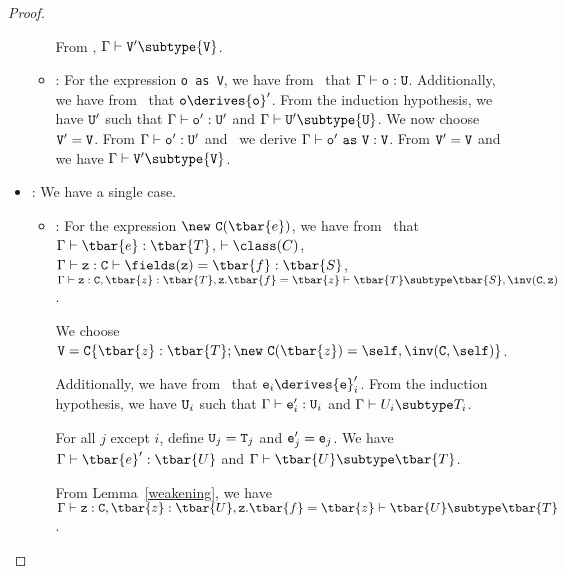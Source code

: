 \begin{proof}
\begin{itemize}
\begin{itemize}
            From , $\Gamma \vdash {\tt V}' \subtype {\tt V}$.
   \item
   \RCCast: For the expression {\tt o~as~V}, we have from \TCast\ that
            $\Gamma \vdash {\tt o}: {\tt U}$.
            Additionally, we have from \RCCast\ that
            ${\tt o} \derives {{\tt o}}'$.
            From the induction hypothesis, we have ${\tt U}'$ such that
            $\Gamma \vdash {\tt o}': {\tt U}'$ and
            $\Gamma \vdash {\tt U}' \subtype {\tt U}$.
            We now choose ${\tt V}'={\tt V}$.
            From $\Gamma \vdash {\tt o}': {\tt U}'$ and \TCast\ we derive
            $\Gamma \vdash {\tt o}'{\tt ~as~V} : {\tt V}$.
            From ${\tt V}'={\tt V}$ and 
            we have $\Gamma \vdash {\tt V}' \subtype {\tt V}$.
   \end{itemize}
\item
\TNew: We have a single case.
   \begin{itemize}
   \item
   \RCNewArg: For the expression ${\new\ {\tt C}(\tbar{e})}$,
            we have from \TNew\ that
            $\Gamma \vdash \tbar{e}: \tbar{T}$,
            $\vdash \class(C)$,
            $\Gamma \vdash {\tt z}: {\tt C} \vdash \fields({\tt z}) = \tbar{f}: \tbar{S}$,
            $\Gamma \vdash {\tt z}: {\tt C}, \tbar{z}: \tbar{T}, {\tt z}.\tbar{f} = \tbar{z} \vdash \tbar{T} \subtype \tbar{S}, \inv({\tt C}, {\tt z})$.

            We choose
            ${\tt V} = {\tt C}\{ \tbar{z}: \tbar{T}; \new\ {\tt C}(\tbar{z}) = \self, \inv({\tt C}, \self)\}$.

            Additionally, we have from \RCNewArg\ that
            ${\tt e}_i \derives {{\tt e}}_i'$.
            From the induction hypothesis, we have ${\tt U}_i$ such that
            $\Gamma \vdash {\tt e}_i': {{\tt U}}_i$ and 
            $\Gamma \vdash U_i \subtype T_i$.

            For all $j$ except $i$, define ${\tt U}_j = {\tt T}_j$ and ${\tt e}_j' = {\tt e}_j$.
            We have 
            $\Gamma \vdash \tbar{e}': \tbar{U}$ and
            $\Gamma \vdash \tbar{U} \subtype \tbar{T}$.

            From Lemma~\ref{weakening}, we have
            $\Gamma \vdash {\tt z}: {\tt C}, \tbar{z}: \tbar{U}, {\tt z}.\tbar{f} = \tbar{z} \vdash \tbar{U} \subtype \tbar{T}$.



\end{itemize}
\end{itemize}
\end{proof}
